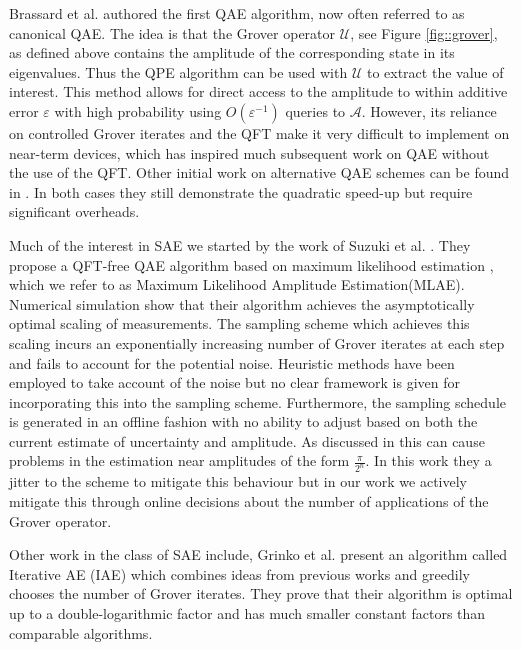 Brassard et al. \cite{brassard_2002_q_amp_amp} authored the first QAE algorithm, now often referred to as canonical QAE. The idea is that the Grover operator $\mathcal{U}$, see Figure \ref{fig::grover}, as defined above contains the amplitude of the corresponding state in its eigenvalues. Thus the QPE algorithm can be used with $\mathcal{U}$ to extract the value of interest. This method allows for direct access to the amplitude to within additive error $\varepsilon$ with high probability using $O(\varepsilon^{-1})$ queries to $\mathcal{A}$. However, its reliance on controlled Grover iterates and the QFT make it very difficult to implement on near-term devices, which has inspired much subsequent work on QAE without the use of the QFT. Other initial work on alternative QAE schemes can be found in \cite{wie_2019_simpler_q_counting,  aaronson_2021_q_approx_counting}. In both cases they still demonstrate the quadratic speed-up but require significant overheads.


Much of the interest in SAE we started by the work of Suzuki et al. \cite{suzuki_2020_amp_without_phase}. They propose a QFT-free QAE algorithm based on maximum likelihood estimation , which we refer to as Maximum Likelihood Amplitude Estimation(MLAE). Numerical simulation show that their algorithm achieves the asymptotically optimal scaling of measurements. The sampling scheme which achieves this scaling incurs an exponentially increasing number of Grover iterates at each step and fails to account for the potential noise. Heuristic methods have been employed to take account of the noise \cite{} but no clear framework is given for incorporating this into the sampling scheme.  Furthermore, the sampling schedule is generated in an offline fashion with no ability to adjust based on both the current estimate of uncertainty and amplitude. As discussed in \cite{callison_2022_amp_with_jitter} this can cause problems in the estimation near amplitudes of the form $\frac{\pi}{2^n}$. In this work they a jitter to the scheme to mitigate this behaviour but in our work we actively mitigate this through online decisions about the number of applications of the Grover operator.

Other work in the class of SAE include, Grinko et al. \cite{grinko_2021_iterative_qae} present an algorithm called Iterative AE (IAE) which combines ideas from previous works and greedily chooses the number of Grover iterates. They prove that their algorithm is optimal up to a double-logarithmic factor and has much smaller constant factors than comparable algorithms.

